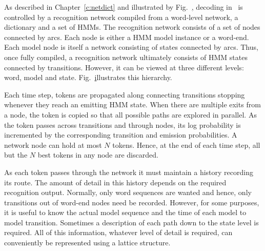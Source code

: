 
As described in Chapter~\ref{c:netdict} and illustrated by
Fig.~\href{f:recsys}, decoding in \HTK\ is controlled by a recognition
network compiled from a word-level network, a dictionary and a set of
HMMs.  The recognition network consists of a set of nodes connected
by arcs.  Each node is either a HMM model instance or a word-end.
Each model node is itself a network consisting of states connected by
arcs.  Thus, once fully compiled, a recognition 
network ultimately
consists of HMM states connected by transitions.  However, it can be
viewed at three different levels: word, model and state.
Fig.~\href{f:recnetlev} illustrates this hierarchy.


Each time step,
tokens are propagated along connecting transitions stopping whenever they
reach an emitting HMM state.  When there are multiple exits from a node,
the token is copied so that all possible paths are explored in parallel.
As the token passes across transitions and through nodes, its log probability
is incremented by the corresponding transition and emission probabilities.
A network node can hold at most $N$ tokens.  Hence, at the end of each time step,
all but the $N$ best tokens in any node are discarded.


As each token passes through the network it must maintain a history
recording its route.  The amount of detail in this history depends
on the required recognition output.  Normally, only word sequences
are wanted and hence, only transitions out of word-end nodes need
be recorded.  However, for some purposes, it is useful to know the
actual model sequence and the time of each model to model transition.
Sometimes a description of each path down to the state level
is required.  All of this information, whatever level of detail is
required, can conveniently be represented using a lattice structure.

